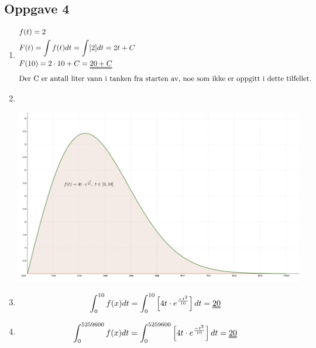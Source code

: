 \documentclass[norsk,11pt,a4paper]{report}
\newcommand{\oppgave}[1]{\subsection*{Oppgave #1}}
\newcommand{\oppgaveDelStart}{\begin{enumerate}[leftmargin=*,itemsep=1cm,labelsep=1.5em,label=\alph*)]}
\newcommand{\oppgaveDelSlutt}{\end{enumerate}}
\newcommand{\oppgaveDel}[1]{\item[#1)]}
\newcommand{\m}{\cdot}
\begin{document}
\newpage
\oppgave{4}
\oppgaveDelStart
\oppgaveDel{a}
\begin{align*}
&f(t) = 2\\
&F(t) = \int f(t)dt = \int [2]dt = 2t + C\\
&F(10) = 2 \m 10 + C = \uuline{20 + C}\\
&\text{Der C er antall liter vann i tanken fra starten av, noe som ikke er oppgitt i dette tilfellet.}
\end{align*}
\oppgaveDel{b}\ \\
\begin{center}
\includegraphics[scale=0.4]{2025-04-10_192739.png}
\end{center}
\oppgaveDel{c}
\begin{align*}
&\int_{0}^{10} f(x) dt = \int_{0}^{10} \left[ 4t \m e^{\frac{-t^2}{10}} \right] dt = \uuline{20} %
\end{align*}
\oppgaveDel{d}
\begin{align*}
&\int_{0}^{5259600} f(x) dt = \int_{0}^{5259600} \left[ 4t \m e^{\frac{-t^2}{10}} \right] dt = \uuline{20} %
\end{align*}
\oppgaveDelSlutt

\end{document}
